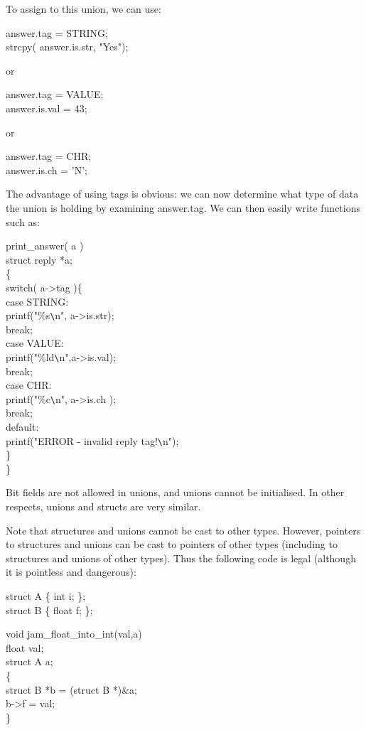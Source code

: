      To assign to this union, we can use:
\begin{code}
  answer.tag = STRING; \\
  strcpy( answer.is.str, "Yes");
\end{code}
\noindent
     or
\begin{code}
 answer.tag = VALUE; \\
 answer.is.val = 43;
\end{code}
\noindent
     or
\begin{code}
  answer.tag = CHR;     \\
  answer.is.ch = 'N';
\end{code}
\noindent
     The advantage of using tags is obvious: we can now determine what
type of data the  union is  holding by  examining {\cd answer.tag}.
We can then easily write functions such as:
\begin{code}
        print\_answer( a ) \\
        \> struct reply *a;  \\
		  \{ \+\\
	       switch( a->tag )\{ \\
          case STRING: 									\\
			 \> printf("\%s\verb+\+n", a->is.str); \\
			 \> break; \\
          case VALUE: 									\\
			 \> printf("\%ld\verb+\+n",a->is.val); \\
			 \> break; \\
          case CHR: 										\\
			 \> printf("\%c\verb+\+n", a->is.ch ); \\
			 \> break; \\
          default: 										\\
			 \> printf("ERROR - invalid reply tag!\verb+\+n"); \\
          \} \-\\
        \}
\end{code}
\noindent
     Bit fields  are not  allowed in 
unions, and unions cannot be
initialised.  In other respects,  unions and  structs are
very similar.

     Note that structures and unions cannot be cast to other 
types. However, pointers to structures and unions 
can be cast to pointers of
other types (including to structures and unions of other types). 
Thus the following
code is legal (although it is pointless and dangerous):
\begin{code}
struct A \{ int i; \}; \\
struct B \{ float f; \}; \addVspace

void jam\_float\_into\_int(val,a) \\
\>float val; \\
\>struct A a; \\
\{ \\
\>struct B *b = (struct B *)\&a; \\
\>b->f = val; \\
\}
\end{code}


